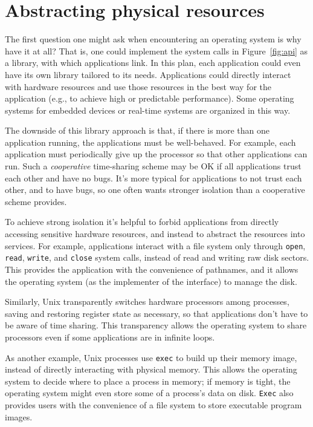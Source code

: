 
\section{Abstracting physical resources}

The first question one might ask when encountering an operating system is why
have it at all?  That is, one could implement the system calls in
Figure~\ref{fig:api}
as a library, with which applications link.  In this plan,
each application could even have its own library tailored to its needs.
Applications could directly interact with hardware resources
and use those resources in the best way for the application (e.g., to achieve
high or predictable performance).  Some operating systems for
embedded devices or real-time systems are organized in this way.

The downside of this library approach is that, if there is more than one
application running, the applications must be well-behaved.
For example, each application must periodically give up the
processor so that other applications can run.
Such a 
\textit{cooperative} 
time-sharing scheme may be OK if all applications trust each
other and have no bugs. It's more typical for applications
to not trust each other, and to have bugs, so one often wants
stronger isolation than a cooperative scheme provides.

To achieve strong isolation it's helpful to forbid applications from
directly accessing sensitive hardware resources, and instead to abstract the
resources into services.  For example, applications interact with a file system
only through
\lstinline{open},
\lstinline{read},
\lstinline{write}, 
and
\lstinline{close}
system calls,
instead of read and writing raw disk sectors. 
This provides the application with the convenience of pathnames, and it allows
the operating system (as the implementer of the interface) to manage the disk. 

Similarly, Unix transparently switches hardware processors among processes,
saving and restoring register state as necessary,
so that applications don't have to be
aware of time sharing.  This transparency allows the operating system to share
processors even if some applications are in infinite loops.

As another example, Unix processes use 
\lstinline{exec}
to build up their memory image, instead of directly interacting with physical
memory.  This allows the operating system to decide where to place a process in
memory; if memory is tight, the operating system might even store some of
a process's data on disk.
\lstinline{Exec}
also provides
users with the convenience of a file system to store executable program images.  

